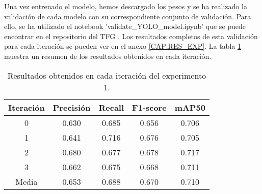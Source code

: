 Una vez entrenado el modelo, hemos descargado los pesos y se ha realizado la validación de cada modelo con su correspondiente conjunto de validación. Para ello, se ha utilizado el notebook 'validate\_YOLO\_model.ipynb' que se puede encontrar en el repositorio del TFG \cite{TFG_Repository}. Los resultados completos de esta validación para cada iteración se pueden ver en el anexo \ref{CAP:RES_EXP}. La tabla \ref{tab:exp1_results} muestra un resumen de los resultados obtenidos en cada iteración.

\begin{table}[H]
    \centering
    \begin{tabular}{|c|c|c|c|c|}
        \hline
        \textbf{Iteración} & \textbf{Precisión} & \textbf{Recall} & \textbf{F1-score} & \textbf{mAP50} \\ \hline
        0       & 0.630 & 0.685 & 0.656 & 0.706 \\ \hline
        1       & 0.641 & 0.716 & 0.676 & 0.705 \\ \hline
        2       & 0.680 & 0.677 & 0.678 & 0.717 \\ \hline
        3       & 0.662 & 0.675 & 0.668 & 0.711 \\ \hline
        Media   & 0.653 & 0.688 & 0.670 & 0.710 \\ \hline
    \end{tabular}
    \caption{Resultados obtenidos en cada iteración del experimento 1.}
    \label{tab:exp1_results}
\end{table}

